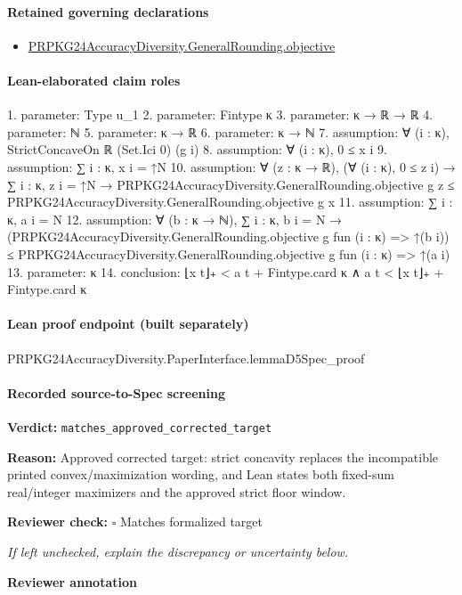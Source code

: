 \documentclass[10pt]{article}
\newcommand{\reviewerbox}{%
  \par\noindent\fbox{\parbox{0.96\linewidth}{\rule{0pt}{0.38in}}}\par
}
\newcommand{\reviewmatch}[1]{%
  \par\noindent\textbf{Reviewer check:} $\square$\; #1\par
  \noindent\emph{If left unchecked, explain the discrepancy or uncertainty below.}\par
}
\begin{document}
\paragraph{Retained governing declarations}
\begin{itemize}\raggedright
\item \hyperlink{governing-declaration-cc542debd8b330da}{PRPKG24\allowbreak{}Accuracy\allowbreak{}Diversity.\allowbreak{}General\allowbreak{}Rounding.\allowbreak{}objective}
\end{itemize}
\paragraph{Lean-elaborated claim roles}\begin{ReviewVerbatim}
1. parameter: Type u_1
2. parameter: Fintype κ
3. parameter: κ → ℝ → ℝ
4. parameter: ℕ
5. parameter: κ → ℝ
6. parameter: κ → ℕ
7. assumption: ∀ (i : κ), StrictConcaveOn ℝ (Set.Ici 0) (g i)
8. assumption: ∀ (i : κ), 0 ≤ x i
9. assumption: ∑ i : κ, x i = ↑N
10. assumption: ∀ (z : κ → ℝ),
  (∀ (i : κ), 0 ≤ z i) →
    ∑ i : κ, z i = ↑N →
      PRPKG24AccuracyDiversity.GeneralRounding.objective g z ≤ PRPKG24AccuracyDiversity.GeneralRounding.objective g x
11. assumption: ∑ i : κ, a i = N
12. assumption: ∀ (b : κ → ℕ),
  ∑ i : κ, b i = N →
    (PRPKG24AccuracyDiversity.GeneralRounding.objective g fun (i : κ) => ↑(b i)) ≤
      PRPKG24AccuracyDiversity.GeneralRounding.objective g fun (i : κ) => ↑(a i)
13. parameter: κ
14. conclusion: ⌊x t⌋₊ < a t + Fintype.card κ ∧ a t < ⌊x t⌋₊ + Fintype.card κ
\end{ReviewVerbatim}

\paragraph{Lean proof endpoint (built separately)}\begin{ReviewVerbatim}
PRPKG24AccuracyDiversity.PaperInterface.lemmaD5Spec_proof
\end{ReviewVerbatim}

\paragraph{Recorded source-to-Spec screening}
\textbf{Verdict:} \texttt{matches\_approved\_corrected\_target}
\\
{\raggedright
\textbf{Reason:} Approved corrected target:\allowbreak{} strict concavity replaces the incompatible printed convex/\allowbreak{}maximization wording, and Lean states both fixed-\allowbreak{}sum real/\allowbreak{}integer maximizers and the approved strict floor window.\allowbreak{}
\par}
\reviewmatch{Matches formalized target}
\noindent\textbf{Reviewer annotation}\par
\reviewerbox
\clearpage
\hypertarget{source-claim-4a13a0b223d63917}{}
\end{document}
